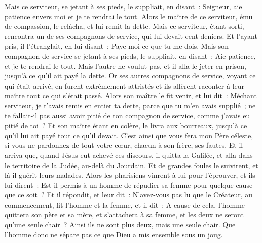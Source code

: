 \begin{multicols}{2}
Mais ce serviteur, se jetant à ses pieds, le suppliait, en disant~: Seigneur, aie patience envers moi et je te rendrai le tout.
Alors le maître de ce serviteur, ému de compassion, le relâcha, et lui remit la dette.
Mais ce serviteur, étant sorti, rencontra un de ses compagnons de service, qui lui devait cent deniers. Et l'ayant pris, il l'étranglait, en lui disant~: Paye-moi ce que tu me dois.
Mais son compagnon de service se jetant à ses pieds, le suppliait, en disant~: Aie patience, et je te rendrai le tout.
Mais l'autre ne voulut pas, et il alla le jeter en prison, jusqu'à ce qu'il ait payé la dette.
Or ses autres compagnons de service, voyant ce qui était arrivé, en furent extrêmement attristés et ils allèrent raconter à leur maître tout ce qui s'était passé.
Alors son maître le fit venir, et lui dit~: Méchant serviteur, je t'avais remis en entier ta dette, parce que tu m'en avais supplié~;
ne te fallait-il pas aussi avoir pitié de ton compagnon de service, comme j'avais eu pitié de toi~?
Et son maître étant en colère, le livra aux bourreaux, jusqu'à ce qu'il lui ait payé tout ce qu'il devait.
C'est ainsi que vous fera mon Père céleste, si vous ne pardonnez de tout votre cœur, chacun à son frère, ses fautes.
\VerseOne{}Et il arriva que, quand Jésus eut achevé ces discours, il quitta la Galilée, et alla dans le territoire de la Judée, au-delà du Jourdain.
Et de grandes foules le suivirent, et là il guérit leurs malades.
Alors les pharisiens vinrent à lui pour l'éprouver, et ils lui dirent~: Est-il permis à un homme de répudier sa femme pour quelque cause que ce soit~?
Et il répondit, et leur dit~: N'avez-vous pas lu que le Créateur, au commencement, fit l'homme et la femme,
et il dit~: A cause de cela, l'homme quittera son père et sa mère, et s'attachera à sa femme, et les deux ne seront qu'une seule chair~?
Ainsi ils ne sont plus deux, mais une seule chair. Que l'homme donc ne sépare pas ce que Dieu a mis ensemble sous un joug.

\end{multicols}
